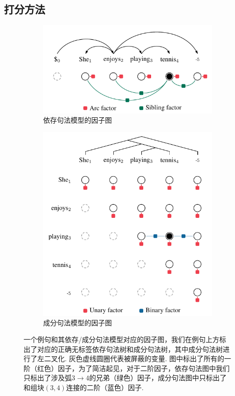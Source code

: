 \subsection{打分方法}

\begin{figure}[tb!]
    \centering
    \begin{subfigure}[b]{0.8\textwidth}
        \centering
        \includegraphics[scale=1]{figures/dep-factors.pdf}
        \caption{依存句法模型的因子图}
        \label{fig:con-factors}
    \end{subfigure}
    \begin{subfigure}[b]{0.8\textwidth}
        \centering
        \includegraphics[scale=1]{figures/con-factors.pdf}
        \caption{成分句法模型的因子图}
        \label{fig:dep-factors}
    \end{subfigure}
    \caption{一个例句和其依存/成分句法模型对应的因子图，我们在例句上方标出了对应的正确无标签依存句法树和成分句法树，其中成分句法树进行了左二叉化.
        灰色虚线圆圈代表被屏蔽的变量.
        图中标出了所有的一阶（红色）因子，为了简洁起见，对于二阶因子，依存句法图中我们只标出了涉及弧$3\rightarrow 4$的兄弟（绿色）因子，成分句法图中只标出了和组块$(3, 4)$连接的二阶（蓝色）因子.}
    \label{fig:dep-vi-factors}
\end{figure}


